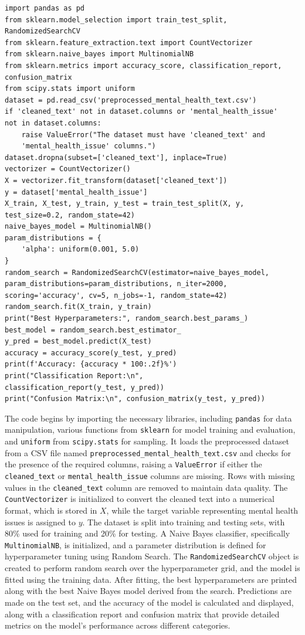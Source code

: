 \begin{verbatim}
import pandas as pd
from sklearn.model_selection import train_test_split, 
RandomizedSearchCV
from sklearn.feature_extraction.text import CountVectorizer
from sklearn.naive_bayes import MultinomialNB
from sklearn.metrics import accuracy_score, classification_report, 
confusion_matrix
from scipy.stats import uniform
dataset = pd.read_csv('preprocessed_mental_health_text.csv')
if 'cleaned_text' not in dataset.columns or 'mental_health_issue' 
not in dataset.columns:
    raise ValueError("The dataset must have 'cleaned_text' and 
    'mental_health_issue' columns.")
dataset.dropna(subset=['cleaned_text'], inplace=True)
vectorizer = CountVectorizer()
X = vectorizer.fit_transform(dataset['cleaned_text'])
y = dataset['mental_health_issue']
X_train, X_test, y_train, y_test = train_test_split(X, y, 
test_size=0.2, random_state=42)
naive_bayes_model = MultinomialNB()
param_distributions = {
    'alpha': uniform(0.001, 5.0)
}
random_search = RandomizedSearchCV(estimator=naive_bayes_model, 
param_distributions=param_distributions, n_iter=2000, 
scoring='accuracy', cv=5, n_jobs=-1, random_state=42)
random_search.fit(X_train, y_train)
print("Best Hyperparameters:", random_search.best_params_)
best_model = random_search.best_estimator_
y_pred = best_model.predict(X_test)
accuracy = accuracy_score(y_test, y_pred)
print(f'Accuracy: {accuracy * 100:.2f}%')
print("Classification Report:\n", 
classification_report(y_test, y_pred))
print("Confusion Matrix:\n", confusion_matrix(y_test, y_pred))
\end{verbatim}

\noindent
The code begins by importing the necessary libraries, including \texttt{pandas} for data manipulation, various functions from \texttt{sklearn} for model training and evaluation, and \texttt{uniform} from \texttt{scipy.stats} for sampling. It loads the preprocessed dataset from a CSV file named \texttt{preprocessed\_mental\_health\_text.csv} and checks for the presence of the required columns, raising a \texttt{ValueError} if either the \texttt{cleaned\_text} or \texttt{mental\_health\_issue} columns are missing. Rows with missing values in the \texttt{cleaned\_text} column are removed to maintain data quality. The \texttt{CountVectorizer} is initialized to convert the cleaned text into a numerical format, which is stored in \(X\), while the target variable representing mental health issues is assigned to \(y\). The dataset is split into training and testing sets, with 80\% used for training and 20\% for testing. A Naive Bayes classifier, specifically \texttt{MultinomialNB}, is initialized, and a parameter distribution is defined for hyperparameter tuning using Random Search. The \texttt{RandomizedSearchCV} object is created to perform random search over the hyperparameter grid, and the model is fitted using the training data. After fitting, the best hyperparameters are printed along with the best Naive Bayes model derived from the search. Predictions are made on the test set, and the accuracy of the model is calculated and displayed, along with a classification report and confusion matrix that provide detailed metrics on the model's performance across different categories.

